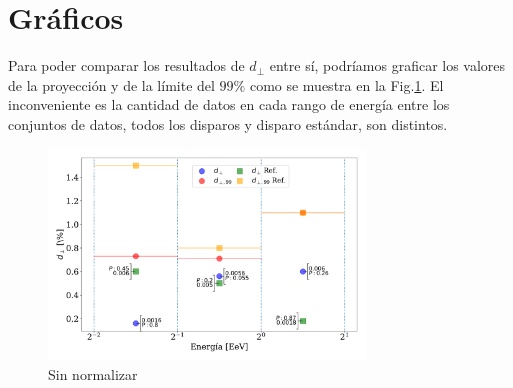     \section{Gráficos}

    Para poder comparar los resultados de $d_\perp$ entre sí, podríamos graficar los valores de la proyección y de la límite del $99\%$ como se muestra en la Fig.\ref{fig:no_normalizado}. El inconveniente es la cantidad de datos en cada rango de energía entre los conjuntos de datos, todos los disparos y disparo estándar, son distintos.



    \begin{figure}[H]
        \begin{small}
            \begin{center}
                \includegraphics[width=0.75\textwidth]{d_perp_no_normalizado_v4.pdf}
            \end{center}
            \caption{Sin normalizar}
            \label{fig:no_normalizado}
        \end{small}
    \end{figure}
    


